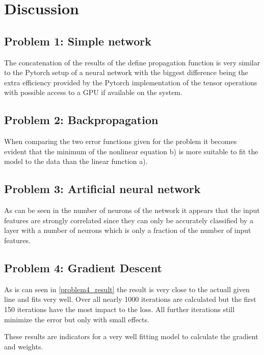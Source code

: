 \chapter{Discussion}
\section{Problem 1: Simple network}
The concatenation of the results of the define propagation function is very similar to the Pytorch setup of a neural network with the biggest difference being the extra efficiency provided by the Pytorch implementation of the tensor operations with possible access to a GPU if available on the system.
\section{Problem 2: Backpropagation}
When comparing the two error functions given for the problem it becomes evident that the minimum of the nonlinear equation b) is more suitable to fit the model to the data than the linear function a).
\section{Problem 3: Artificial neural network}
As can be seen in the number of neurons of the network it appears that the input features are strongly correlated since they can only be accurately classified by a layer with a number of neurons which is only a fraction of the number of input features.
\section{Problem 4: Gradient Descent}
As is can seen in \ref{problem4_result} the result is very close to the actuall given line and fits very well.
Over all nearly 1000 iterations are calculated but the first 150 iterations have the most impact to the loss.
All further iterations still minimize the error but only with small effects.

These results are indicators for a very well fitting model to calculate the gradient and weights.

